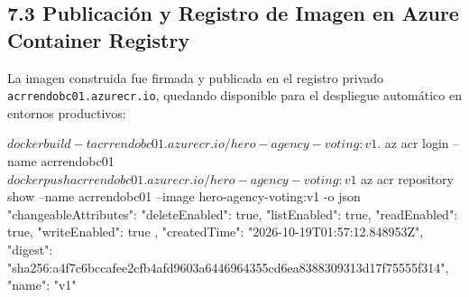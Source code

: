 \subsection{7.3 Publicación y Registro de Imagen en Azure Container Registry}
La imagen construida fue firmada y publicada en el registro privado \texttt{acrrendobc01.azurecr.io}, quedando disponible para el despliegue automático en entornos productivos:

\begin{azureterminal}
$ docker build -t acrrendobc01.azurecr.io/hero-agency-voting:v1 .
$ az acr login --name acrrendobc01
$ docker push acrrendobc01.azurecr.io/hero-agency-voting:v1

$ az acr repository show --name acrrendobc01 --image hero-agency-voting:v1 -o json
{
  "changeableAttributes": {
    "deleteEnabled": true,
    "listEnabled": true,
    "readEnabled": true,
    "writeEnabled": true
  },
  "createdTime": "2026-10-19T01:57:12.848953Z",
  "digest": "sha256:a4f7c6bccafee2cfb4afd9603a6446964355cd6ea8388309313d17f75555f314",
  "name": "v1"
}
\end{azureterminal}
